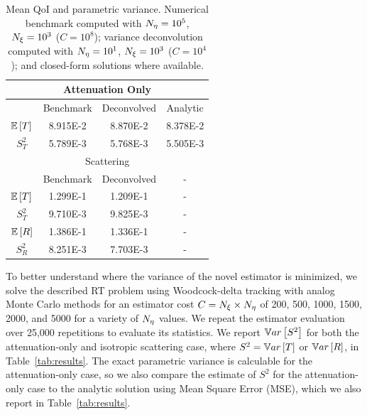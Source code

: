 \begin{table}[ht]
    \centering
    \caption{Mean QoI and parametric variance. Numerical benchmark computed with ${N_\eta}=10^5$, ${N_\xi}=10^3$ ($C = 10^8$); variance deconvolution computed with ${N_\eta}=10^1$, ${N_\xi}=10^3$ ($C=10^4$); and closed-form solutions where available.}
	\begin{tabular}{| c | c | c | c |} \hline
	\multicolumn{4}{|c|}{Attenuation Only} \\ \hline
	 			& Benchmark 	& Deconvolved 	& Analytic \\ \hline
	$\mathbb{E}\left[T\right]$ 	& 8.915E-2	& 8.870E-2 	& 8.378E-2  \\ \hline
	$S^2_T$ 		& 5.789E-3 	& 5.768E-3	& 5.505E-3  \\ \hline 
	\multicolumn{4}{|c|}{Scattering} \\ \hline
	 			& Benchmark 	& Deconvolved 	& - \\ \hline
	$\mathbb{E}\left[T\right]$ 	&  1.299E-1	& 1.209E-1 	& -  \\ \hline
	$S^2_T$ 		& 9.710E-3 	& 9.825E-3	& -\\ \hline
	$\mathbb{E}\left[R\right]$ 	&  1.386E-1	& 1.336E-1 	& -  \\ \hline
	$S^2_R$ 		& 8.251E-3 	& 7.703E-3	& -\\ \hline
	\end{tabular}
    \label{tab:rad-transport-results}
\end{table}

To better understand where the variance of the novel estimator is minimized, we solve the described RT problem using Woodcock-delta tracking with analog Monte Carlo methods for an estimator cost $C={N_\xi} \times {N_\eta}$ of 200, 500, 1000, 1500, 2000, and 5000 for a variety of ${N_\eta}$ values. We repeat the estimator evaluation over 25,000 repetitions to evaluate its statistics. We report $\mathbb{V}ar\left[S^2\right]$ for both the attenuation-only and isotropic scattering case, where  $S^2=\mathbb{V}ar\left[T\right]$ or $\mathbb{V}ar\left[R\right]$, in Table~\ref{tab:results}. The exact parametric variance is calculable for the attenuation-only case, so we also compare the estimate of $S^2$ for the attenuation-only case to the analytic solution using Mean Square Error (MSE), which we also report in Table~\ref{tab:results}. 

